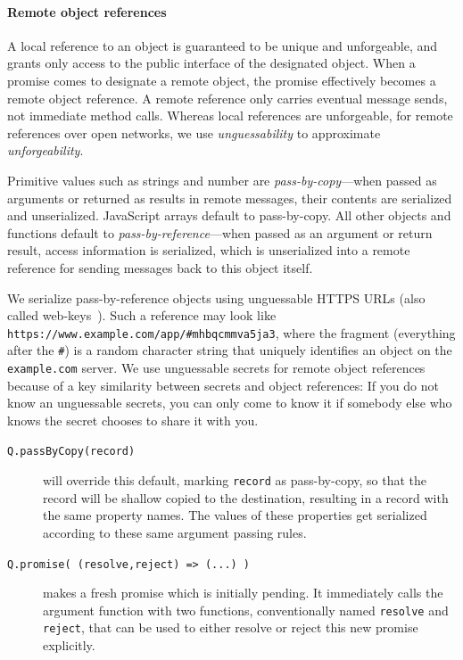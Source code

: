 \documentclass{llncs}
\begin{document}
\paragraph{Remote object references}

A local reference to an object is guaranteed to be unique and unforgeable, and grants only access to the public interface of the designated object. When a promise comes to designate a remote object, the promise effectively becomes a remote object reference. A remote reference only carries eventual message sends, not immediate method calls. Whereas local references are unforgeable, for remote references over open networks, we use \emph{unguessability} to approximate \emph{unforgeability}.

Primitive values such as strings and number are \emph{pass-by-copy}---when passed as arguments or returned as results in remote messages, their contents are serialized and unserialized. JavaScript arrays default to pass-by-copy. All other objects and functions default to \emph{pass-by-reference}---when passed as an argument or return result, access information is serialized, which is unserialized into a remote reference for sending messages back to this object itself.

We serialize pass-by-reference objects using unguessable HTTPS URLs (also called web-keys~\cite{Close:Webkeys}). Such a reference may look like {\tt https://www.example.com/app/\#mhbqcmmva5ja3}, where the fragment (everything after the {\tt \#}) is a random character string that uniquely identifies an object on the {\tt example.com} server. We use unguessable secrets for remote object references because of a key similarity between secrets and object references: If you do not know an unguessable secrets, you can only come to know it if somebody else who knows the secret chooses to share it with you.

\begin{description}
\item[{\tt Q.passByCopy(record)}] will override this default, marking {\tt record} as pass-by-copy, so that the record will be shallow copied to the destination, resulting in a record with the same property names. The values of these properties get serialized according to these same argument passing rules.

\item[{\tt Q.promise( (resolve,reject) => (...) )}] makes a fresh promise which is initially pending. It immediately calls the argument function with two functions, conventionally named {\tt resolve} and {\tt reject}, that can be used to either resolve or reject this new promise explicitly. 

\end{description}
\end{document}
